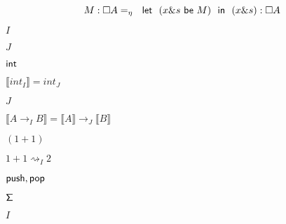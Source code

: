 \documentclass[10pt]{book}
\begin{document}
\begin{mdSnippets}
\begin{mdDisplaySnippet}
\end{mdDisplaySnippet}%
\begin{mdDisplaySnippet}%
\[%
M:\Box A =_{\eta}\ \ {\sf let} \ \ (x \& s\  {\sf be} \ M)\ \ {\sf in}\ \  { (x \& s)}:\Box A
\]%
\end{mdDisplaySnippet}%
\begin{mdInlineSnippet}[dd7536794b63bf90eccfd37f9b147d7f]%
$I$\end{mdInlineSnippet}%
\begin{mdInlineSnippet}%
$J$\end{mdInlineSnippet}%
\begin{mdInlineSnippet}[5816dd164bf4957e60b9dc378faadd4a]%
${\sf int}$\end{mdInlineSnippet}%
\begin{mdInlineSnippet}[168da4daa211ad39e7e2f103d4697538]%
$\llbracket int_I\rrbracket = int_J $\end{mdInlineSnippet}%
\begin{mdInlineSnippet}%
$J$\end{mdInlineSnippet}%
\begin{mdInlineSnippet}[3770b5b04be251b0fdf3f4fc0a74d5fe]%
$\llbracket A\rightarrow_I B\rrbracket =\llbracket A \rrbracket \rightarrow_J \llbracket B \rrbracket $\end{mdInlineSnippet}%
\begin{mdInlineSnippet}[084d81b8c5dc70186c48137b0f155453]%
$(1+1)$\end{mdInlineSnippet}%
\begin{mdInlineSnippet}[4fd47922d2b9f5b8fc0bc97eeb6394fb]%
$1+1\rightsquigarrow_{I} 2$\end{mdInlineSnippet}%
\begin{mdInlineSnippet}%
${\sf push, pop}$\end{mdInlineSnippet}%
\begin{mdInlineSnippet}%
${\sf \Sigma}$\end{mdInlineSnippet}%
\begin{mdInlineSnippet}[dd7536794b63bf90eccfd37f9b147d7f]%
$I$\end{mdInlineSnippet}%

\end{mdSnippets}
\end{document}
